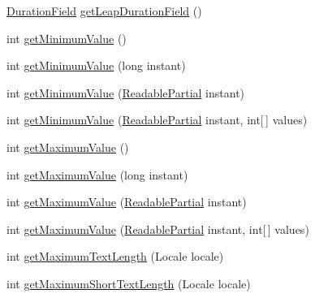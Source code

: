 \begin{DoxyCompactItemize}
\item 
\hyperlink{classorg_1_1joda_1_1time_1_1_duration_field}{Duration\-Field} \hyperlink{classorg_1_1joda_1_1time_1_1field_1_1_unsupported_date_time_field_a2fb32dd3b1688ea420bc21358137f905}{get\-Leap\-Duration\-Field} ()
\item 
int \hyperlink{classorg_1_1joda_1_1time_1_1field_1_1_unsupported_date_time_field_a0705b9c4b58eb769037e6af4bd7db31c}{get\-Minimum\-Value} ()
\item 
int \hyperlink{classorg_1_1joda_1_1time_1_1field_1_1_unsupported_date_time_field_a1849ee7dba792f1f93a5dab9eb3293d8}{get\-Minimum\-Value} (long instant)
\item 
int \hyperlink{classorg_1_1joda_1_1time_1_1field_1_1_unsupported_date_time_field_a9a932fc7c1bed8b552a0023a9b8d2a5b}{get\-Minimum\-Value} (\hyperlink{interfaceorg_1_1joda_1_1time_1_1_readable_partial}{Readable\-Partial} instant)
\item 
int \hyperlink{classorg_1_1joda_1_1time_1_1field_1_1_unsupported_date_time_field_a9ca28cd092b4187b5cfd2bda496353e5}{get\-Minimum\-Value} (\hyperlink{interfaceorg_1_1joda_1_1time_1_1_readable_partial}{Readable\-Partial} instant, int\mbox{[}$\,$\mbox{]} values)
\item 
int \hyperlink{classorg_1_1joda_1_1time_1_1field_1_1_unsupported_date_time_field_a2dabede09fb4a0fc5ffd798c0c5734f6}{get\-Maximum\-Value} ()
\item 
int \hyperlink{classorg_1_1joda_1_1time_1_1field_1_1_unsupported_date_time_field_a8b59c31486f8b270371f4183f0f03576}{get\-Maximum\-Value} (long instant)
\item 
int \hyperlink{classorg_1_1joda_1_1time_1_1field_1_1_unsupported_date_time_field_a37a2c76419138dcfbfe00728a2160aa1}{get\-Maximum\-Value} (\hyperlink{interfaceorg_1_1joda_1_1time_1_1_readable_partial}{Readable\-Partial} instant)
\item 
int \hyperlink{classorg_1_1joda_1_1time_1_1field_1_1_unsupported_date_time_field_a5159bb084b1176db451bf2b6528b634d}{get\-Maximum\-Value} (\hyperlink{interfaceorg_1_1joda_1_1time_1_1_readable_partial}{Readable\-Partial} instant, int\mbox{[}$\,$\mbox{]} values)
\item 
int \hyperlink{classorg_1_1joda_1_1time_1_1field_1_1_unsupported_date_time_field_aad9bbc9b4d6a076d8ebf5cf90752fa50}{get\-Maximum\-Text\-Length} (Locale locale)
\item 
int \hyperlink{classorg_1_1joda_1_1time_1_1field_1_1_unsupported_date_time_field_ae9d9d63c764c73c6c6445e87ece7e407}{get\-Maximum\-Short\-Text\-Length} (Locale locale)

\end{DoxyCompactItemize}
